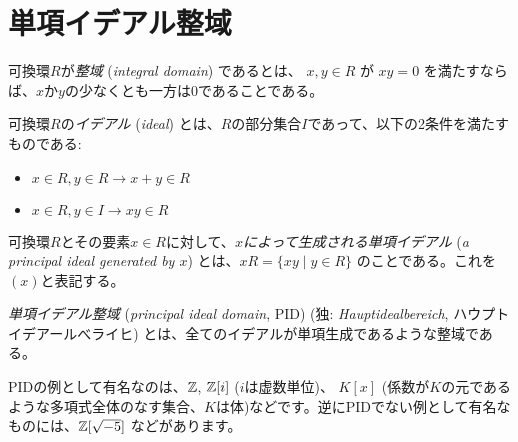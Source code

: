 \documentclass{jsarticle}
\begin{document}
 \section{単項イデアル整域}
 \label{sec:principal-ideal-domain}
 \begin{definition}
  可換環$R$が\emph{整域} (\emph{integral domain}) であるとは、
  $x, y\in R$ が $xy = 0$ を満たすならば、$x$か$y$の少なくとも一方は$0$であることである。
 \end{definition}
 \begin{definition}
  可換環$R$の\emph{イデアル} (\emph{ideal}) とは、$R$の部分集合$I$であって、以下の2条件を満たすものである:
  \begin{itemize}
   \item $x \in R, y \in R \to x + y \in R$
   \item $x \in R, y \in I \to xy \in R$
  \end{itemize}
 \end{definition}
 \begin{definition}
  可換環$R$とその要素$x \in R$に対して、$x$\emph{によって生成される単項イデアル} (\emph{a principal ideal generated by $x$}) とは、$xR = \{ xy \mid y \in R\}$ のことである。これを$(x)$と表記する。
 \end{definition}
 \begin{definition}
  \emph{単項イデアル整域} (\emph{principal ideal domain}, PID) (独: \emph{Hauptidealbereich}, ハウプトイデアールべライヒ) とは、全てのイデアルが単項生成であるような整域である。
 \end{definition}
 \begin{example}
  PIDの例として有名なのは、$\mathbb{Z}$, $\mathbb{Z}[i]$ ($i$は虚数単位)、 $K[x]$ (係数が$K$の元であるような多項式全体のなす集合、$K$は体)などです。逆にPIDでない例として有名なものには、$\mathbb{Z}[\sqrt{-5}]$ などがあります。
 \end{example}
\end{document}
